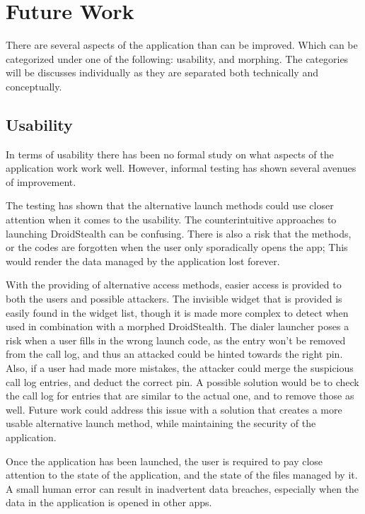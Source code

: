 \section{Future Work}
\label{sec:future-work}

There are several aspects of the application than can be improved. Which
can be categorized under one of the following: usability, and morphing.
The categories will be discusses individually as they are separated both
technically and conceptually. 

\subsection{Usability}
In terms of usability there has been no formal study on what aspects of the application work work well. 
However, informal testing has shown several avenues of improvement. 

The testing has shown that the alternative launch methods could use closer attention when it comes to the usability.
The counterintuitive approaches to launching DroidStealth can be confusing.
There is also a risk that the methods, or the codes are forgotten when the user only sporadically opens the app;
This would render the data managed by the application lost forever.

With the providing of alternative access methods, easier access is provided to both the users and possible attackers.
The invisible widget that is provided is easily found in the widget list, though it is made more complex to detect when used in combination with a morphed DroidStealth.
The dialer launcher poses a risk when a user fills in the wrong launch code, as the entry won't be removed from the call log, and thus an attacked could be hinted towards the right pin. 
Also, if a user had made more mistakes, the attacker could merge the suspicious call log entries, and deduct the correct pin. 
A possible solution would be to check the call log for entries that are similar to the actual one, and to remove those as well.
Future work could address this issue with a solution that creates a more usable alternative launch method, while maintaining the security of the application.

Once the application has been launched, the user is required to pay close attention to the state of the application, and the state of the files managed by it.
A small human error can result in inadvertent data breaches, especially when the data in the application is opened in other apps.

